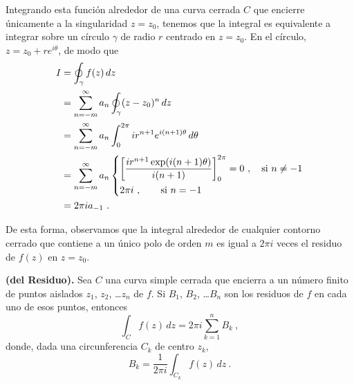 Integrando esta función alrededor de una curva cerrada $C$ que encierre únicamente a la singularidad $z=z_0$, tenemos que la integral es equivalente a integrar sobre un círculo $\gamma$ de radio $r$ centrado en $z=z_0$. En el círculo, $z = z_0 + r e^{i\theta}$, de modo que 
\begin{align*}
    I & = \oint_\gamma f(z) \, dz \\
    & = \sum_{n=-m}^\infty a_n \oint_\gamma (z-z_0)^n \, dz \\
    & = \sum_{n=-m}^\infty a_n \int_0^{2\pi} i r^{n+1} e^{i(n+1)\theta} \, d\theta \\
    & =  \sum_{n=-m}^\infty a_n \begin{dcases}
        \left[\dfrac{ir^{n+1}\exp(i(n+1)\theta)}{i(n+1)} \right]^{2\pi}_0 = 0 \ , \quad \text{si } n \neq -1 \\
        2\pi i \ , \quad \quad \text{si } n = -1
    \end{dcases} \\
    & = 2\pi i a_{-1} \ .
\end{align*}

De esta forma, observamos que la integral alrededor de cualquier contorno cerrado que contiene a un único polo de orden $m$ es igual a $2\pi i$ veces el residuo de $f(z)$ en $z=z_0$.

\begin{teorema}{\textbf{(del Residuo).}}
    Sea $C$ una curva simple cerrada que encierra a un número finito de puntos aislados $z_1$, $z_2$, \dots $z_n$ de $f$. Si $B_1$, $B_2$, \dots $B_n$ son los residuos de $f$ en cada uno de esos puntos, entonces 
    \begin{equation}
        \int_C f(z) \, dz = 2\pi i \sum_{k=1}^n B_k \ ,
    \end{equation}
    donde, dada una circunferencia $C_k$ de centro $z_k$,
    \begin{equation}
        B_k = \frac{1}{2\pi i} \int_{C_k} f(z) \, dz \ .
    \end{equation}
\end{teorema}

